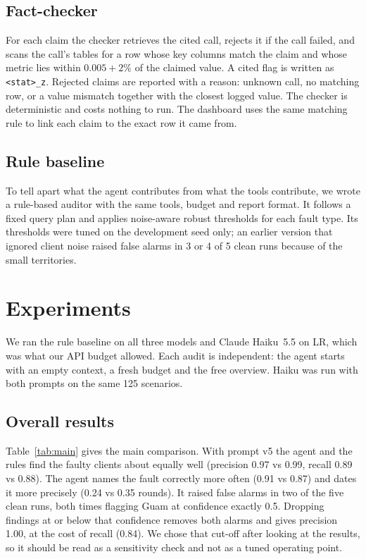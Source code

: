 \documentclass[conference]{IEEEtran}
\newcommand{\figdir}{../results/fedauditor/figures}
\begin{document}
\subsection{Fact-checker}

For each claim the checker retrieves the cited call, rejects it if the call failed, and scans the
call's tables for a row whose key columns match the claim and whose metric lies within
$0.005 + 2\%$ of the claimed value. A cited flag is written as \texttt{<stat>\_z}. Rejected claims are
reported with a reason: unknown call, no matching row, or a value mismatch together with the
closest logged value. The checker is deterministic and costs nothing to run. The dashboard uses the
same matching rule to link each claim to the exact row it came from.

\subsection{Rule baseline}

To tell apart what the agent contributes from what the tools contribute, we wrote a rule-based
auditor with the same tools, budget and report format. It follows a fixed query plan and applies
noise-aware robust thresholds for each fault type. Its thresholds were tuned on the development
seed only; an earlier version that ignored client noise raised false alarms in 3 or 4 of 5 clean runs
because of the small territories.

\section{Experiments}

We ran the rule baseline on all three models and Claude Haiku~5.5 on LR, which was what our API
budget allowed. Each audit is independent: the agent starts with an empty context, a fresh budget
and the free overview. Haiku was run with both prompts on the same 125 scenarios.




\subsection{Overall results}

Table~\ref{tab:main} gives the main comparison. With prompt v5 the agent and the rules find the
faulty clients about equally well (precision 0.97 vs 0.99, recall 0.89 vs 0.88). The agent names
the fault correctly more often (0.91 vs 0.87) and dates it more precisely (0.24 vs 0.35 rounds). It
raised false alarms in two of the five clean runs, both times flagging Guam at confidence exactly
0.5. Dropping findings at or below that confidence removes both alarms and gives precision 1.00, at
the cost of recall (0.84). We chose that cut-off after looking at the results, so it should be read
as a sensitivity check and not as a tuned operating point.
\end{document}
